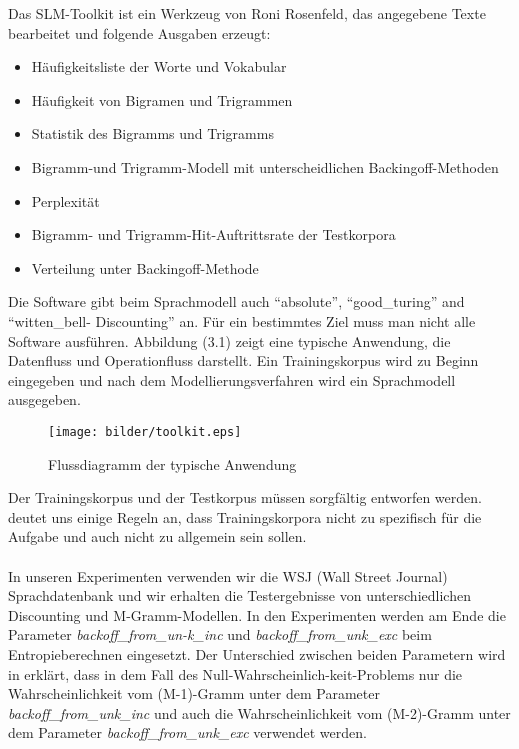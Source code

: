 Das SLM-Toolkit ist ein Werkzeug von Roni Rosenfeld, das angegebene Texte bearbeitet und folgende Ausgaben erzeugt\cite{int_slm_toolkit}:
\begin{itemize}
	\item H\"aufigkeitsliste der Worte und Vokabular
	\item H\"aufigkeit von Bigramen und Trigrammen
	\item Statistik des Bigramms und Trigramms
	\item Bigramm-und Trigramm-Modell mit unterscheidlichen Backingoff-Methoden
	\item Perplexit\"at
	\item Bigramm- und Trigramm-Hit-Auftrittsrate der Testkorpora
	\item Verteilung unter Backingoff-Methode 
\end{itemize}
Die Software gibt beim Sprachmodell auch "`absolute"', "`good\_turing"' and "`witten\_bell- Discounting"' an.
F\"ur ein bestimmtes Ziel muss man nicht alle Software ausf\"uhren. Abbildung (3.1) zeigt eine typische Anwendung, die Datenfluss und Operationfluss darstellt.
Ein Trainingskorpus wird zu Beginn eingegeben und nach dem Modellierungsverfahren wird ein Sprachmodell ausgegeben.
\begin{figure}[h]
	\centering
	\texttt{[image: bilder/toolkit.eps]}
	 \caption{Flussdiagramm der typische Anwendung}
  \label{fig:figure_2}
\end{figure}
Der Trainingskorpus und der Testkorpus m\"ussen sorgf\"altig entworfen werden. \cite{book_speech} deutet uns einige Regeln an, dass Trainingskorpora nicht zu spezifisch f\"ur die Aufgabe und auch nicht zu allgemein sein sollen.  
\\
\\
In unseren Experimenten verwenden wir die WSJ (Wall Street Journal) Sprachdatenbank und wir erhalten die Testergebnisse von unterschiedlichen Discounting und M-Gramm-Modellen. In den Experimenten werden am Ende die Parameter \emph{backoff\_from\_un-k\_inc} und \emph{backoff\_from\_unk\_exc} beim Entropieberechnen eingesetzt. Der Unterschied zwischen beiden Parametern wird in \cite{int_slm_toolkit} erkl\"art, dass in dem Fall des Null-Wahrscheinlich-keit-Problems nur die Wahrscheinlichkeit vom (M-1)-Gramm unter dem Parameter \emph{backoff\_from\_unk\_inc} und auch die Wahrscheinlichkeit vom (M-2)-Gramm unter dem Parameter \emph{backoff\_from\_unk\_exc} verwendet werden.
\\
\\  
